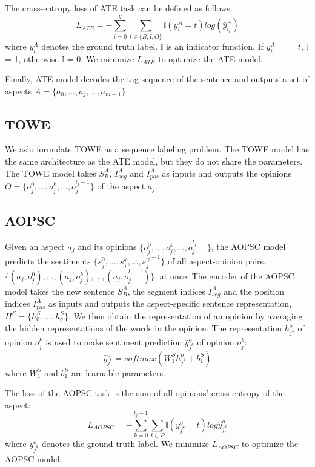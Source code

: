 \documentclass[11pt]{article}
\begin{document}
The cross-entropy loss of ATE task can be defined as follows:
\begin{equation}
	L_{ATE}=-\sum_{i=0}^{q}\sum_{t \in \{B, I, O\}}\mathbb{I}(y^A_i=t)log(\hat{y}^A_{i_t})
\end{equation}
where $y^A_i$ denotes the ground truth label. $\mathbb{I}$ is an indicator function.  If $y^A_i==t$, $\mathbb{I}$ = 1, otherwise $\mathbb{I}$ = 0. We minimize $L_{ATE}$ to optimize the ATE model.

Finally, ATE model decodes the tag sequence of the sentence and outputs a set of aspects $A=\{a_0,...,a_j,...,a_{m-1}\}$.

\subsection{TOWE}
We aslo formulate TOWE as a sequence labeling problem. The TOWE model has the same architecture as the ATE model, but they do not share the parameters. The TOWE model takes $S^A_{B}$, $I^A_{seg}$ and $I^A_{pos}$ as inputs and outputs the opinions  $O=\{o_j^0,...,o_j^k,..., o_j^{{l_j}-1}\}$ of the aspect $a_j$.

\subsection{AOPSC}
Given an aspect $a_j$ and its opinions  $\{o_j^0,...,o_j^k,..., o_j^{{l_j}-1}\}$, the AOPSC model predicts the sentiments $\{s_j^0, ..., s_j^k, ..., s_j^{{l_j}-1}\}$ of all aspect-opinion pairs, $\{(a_j, o_j^0),...,(a_j, o_j^k),..., (a_j, o_j^{{l_j}-1})\}$, at once. The encoder of the AOPSC model takes the new sentence $S^A_{B}$, the segment indices $I^A_{seg}$ and the position indices $I^A_{pos}$ as inputs and outputs the aspect-specific sentence representation, $H^S=\{h^S_0,...,h^S_{q}\}$. We then obtain the representation of an opinion by averaging the hidden representations of the words in the opinion. The representation $h^o_{j^k}$ of opinion $o_j^k$ is used to make sentiment prediction $\hat{y}^o_{j^k}$ of opinion $o_j^k$:
\begin{equation}
	\hat{y}^o_{j^k}=softmax(W^S_1h^o_{j^k} + b^S_1)
\end{equation}
where $W^S_1$ and $b^S_1$ are learnable parameters.

The loss of the AOPSC task is the sum of all opinions' cross entropy of the aspect:
\begin{equation}
	L_{AOPSC}=-\sum_{k=0}^{{l_j}-1}\sum_{t \in P}\mathbb{I}(y^o_{j^k}=t)log\hat{y}^o_{j^k_t}
\end{equation}
where $y^o_{j^k}$ denotes the ground truth label. We minimize $L_{AOPSC}$ to optimize the AOPSC model. 
\end{document}
